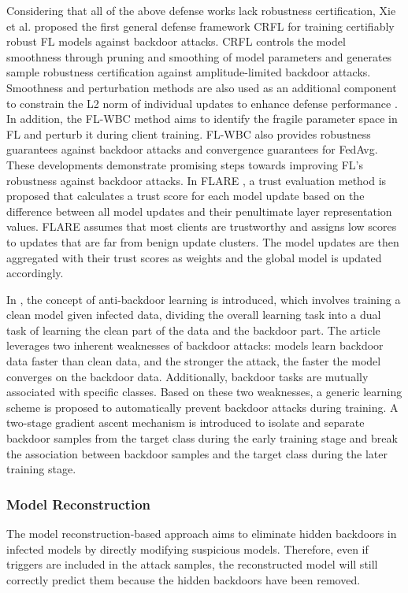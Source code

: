 \documentclass[conference]{IEEEtran}
\begin{document}
Considering that all of the above defense works lack robustness certification, 
Xie et al. \cite{b86} proposed the first general defense framework CRFL for training certifiably robust FL models against backdoor attacks. 
CRFL controls the model smoothness through pruning and smoothing of model parameters and generates sample robustness 
certification against amplitude-limited backdoor attacks. Smoothness and perturbation methods are also used as an 
additional component to constrain the L2 norm of individual updates to enhance defense performance \cite{b87}. 
In addition, the FL-WBC \cite{b88} method aims to identify the fragile parameter space in FL and perturb it 
during client training. FL-WBC also provides robustness guarantees against backdoor attacks and convergence guarantees for FedAvg. 
These developments demonstrate promising steps towards improving FL's robustness against backdoor attacks. In FLARE \cite{b89}, a trust 
evaluation method is proposed that calculates a trust score for each model update based on the difference between all model updates and 
their penultimate layer representation values. FLARE assumes that most clients are trustworthy and assigns low scores 
to updates that are far from benign update clusters. The model updates are then aggregated with their trust scores as 
weights and the global model is updated accordingly.

In \cite{b98}, the concept of anti-backdoor learning is introduced, which involves training a clean model given infected data, 
dividing the overall learning task into a dual task of learning the clean part of the data and the backdoor part. 
The article leverages two inherent weaknesses of backdoor attacks: models learn backdoor data faster than clean data, 
and the stronger the attack, the faster the model converges on the backdoor data. Additionally, backdoor tasks are mutually 
associated with specific classes. Based on these two weaknesses, a generic learning scheme is proposed to automatically prevent 
backdoor attacks during training. A two-stage gradient ascent mechanism is introduced to isolate and separate backdoor samples 
from the target class during the early training stage and break the association between backdoor samples and the target class during the later training stage.
\subsubsection{Model Reconstruction}  
The model reconstruction-based approach aims to eliminate hidden backdoors in infected models by directly modifying suspicious models. 
Therefore, even if triggers are included in the attack samples, the reconstructed model will still correctly predict them because 
the hidden backdoors have been removed.
\end{document}
